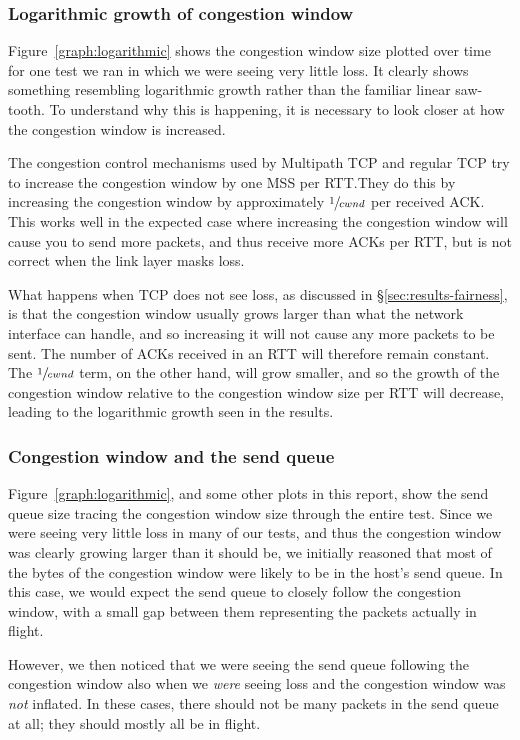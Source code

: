 \subsubsection{Logarithmic growth of congestion window}
Figure~\ref{graph:logarithmic} shows the congestion window size plotted over
time for one test we ran in which we were seeing very little loss. It clearly
shows something resembling logarithmic growth rather than the familiar linear
saw-tooth. To understand why this is happening, it is necessary to look closer
at how the congestion window is increased.

The congestion control mechanisms used by Multipath TCP and regular TCP try to
increase the congestion window by one MSS per RTT.\@ They do this by increasing
the congestion window by approximately $\sfrac{1}{cwnd}$ per received ACK.\@
This works well in the expected case where increasing the congestion window will
cause you to send more packets, and thus receive more ACKs per RTT, but is not
correct when the link layer masks loss.

What happens when TCP does not see loss, as discussed in \S\ref{sec:results-fairness}, 
is that the congestion window usually grows larger than what the network 
interface can handle, and so increasing it will not cause any more packets to be 
sent. The number of ACKs received in an RTT will therefore remain constant. The 
$\sfrac{1}{cwnd}$ term, on the other hand, will grow smaller, and so the growth of the 
congestion window relative to the congestion window size per RTT will decrease, 
leading to the logarithmic growth seen in the results.

\subsubsection{Congestion window and the send queue}
\label{sec:closing:sendq}
Figure~\ref{graph:logarithmic}, and some other plots in this report, show the
send queue size tracing the congestion window size through the entire test.
Since we were seeing very little loss in many of our tests, and thus the
congestion window was clearly growing larger than it should be, we initially
reasoned that most of the bytes of the congestion window were likely to be in
the host's send queue. In this case, we would expect the send queue to closely
follow the congestion window, with a small gap between them representing the
packets actually in flight.

However, we then noticed that we were seeing the send queue following the
congestion window also when we \emph{were} seeing loss and the congestion
window was \emph{not} inflated. In these cases, there should not be many
packets in the send queue at all; they should mostly all be in flight.

